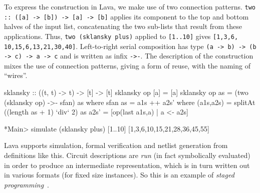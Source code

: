 To express the construction in Lava, we make use of two connection patterns.\newline
{\tt two :: ([a] -> [b]) -> [a] -> [b]} applies its component to
the top and bottom halves of the input list, concatenating the two sub-lists
that result from these applications.
Thus, {\tt two (sklansky plus)} applied to {\tt [1..10]} gives {\tt [1,3,6,} {\tt10,15,6,13,21,30,40]}.
Left-to-right serial composition has type
{\tt (a -> b) -> (b -> c) -> a -> c} and is written as infix {\tt ->-}.
The description of the construction mixes the use of connection patterns, giving a form of reuse, with the naming of ``wires''.

\begin{code}
sklansky :: ((t, t) -> t) -> [t] -> [t]
sklansky op [a] = [a]
sklansky op as = (two (sklansky op) ->- sfan) as
  where
    sfan as = a1s ++ a2s'
      where
        (a1s,a2s) = splitAt ((length as + 1) `div` 2) as
        a2s'      = [op(last a1s,a) | a <- a2s]

*Main> simulate (sklansky plus) [1..10]
[1,3,6,10,15,21,28,36,45,55]
\end{code}

Lava supports simulation, formal verification and netlist generation from definitions like this. Circuit descriptions are {\em run} (in fact symbolically evaluated) in order to produce an intermediate representation, which is in turn written out in various formats (for fixed size instances). So this is an example of {\em staged programming}~.

